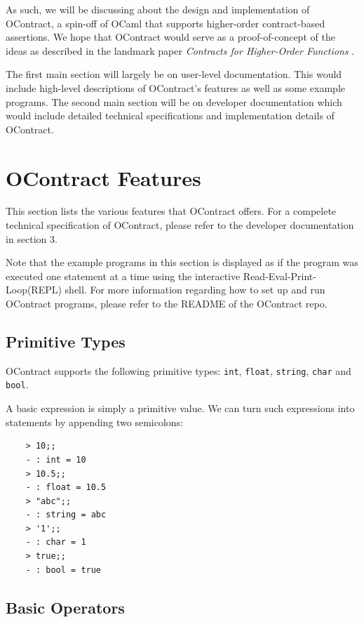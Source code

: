 \documentclass[a4paper]{article}
\begin{document}
As such, we will be discussing about the design and implementation of OContract, a spin-off of OCaml that supports higher-order contract-based assertions.
We hope that OContract would serve as a proof-of-concept of the ideas as described in the landmark paper \emph{Contracts for Higher-Order Functions} \cite{contracts}.

The first main section will largely be on user-level documentation. This would include high-level descriptions of OContract's features as well as some example programs.
The second main section will be on developer documentation which would include detailed technical specifications and implementation details of OContract.

\section{OContract Features}

This section lists the various features that OContract offers.
For a compelete technical specification of OContract, please refer to the developer documentation in section 3.

Note that the example programs in this section is displayed as if the program was executed one statement at a time using the interactive Read-Eval-Print-Loop(REPL) shell.
For more information regarding how to set up and run OContract programs, please refer to the README of the OContract repo.

\subsection{Primitive Types}

OContract supports the following primitive types: \texttt{int}, \texttt{float}, \texttt{string}, \texttt{char} and \texttt{bool}.

A basic expression is simply a primitive value. We can turn such expressions into statements by appending two semicolons:

\begin{verbatim}
    > 10;;
    - : int = 10
    > 10.5;;
    - : float = 10.5
    > "abc";;
    - : string = abc
    > '1';;
    - : char = 1
    > true;;
    - : bool = true
\end{verbatim}

\subsection{Basic Operators}
\end{document}
